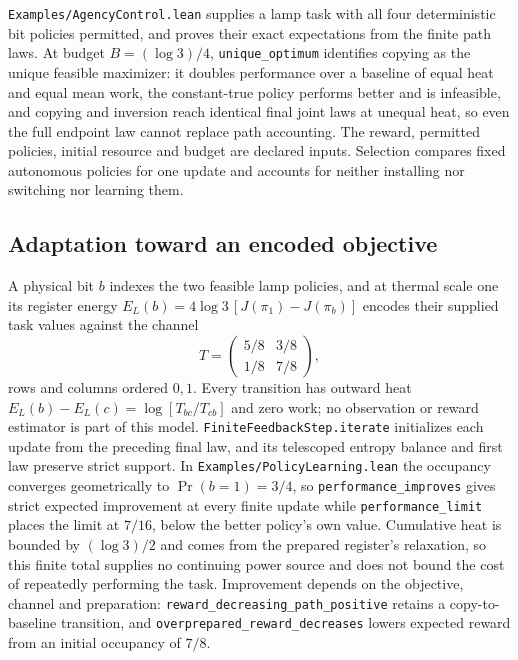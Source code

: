 \documentclass{article}
\begin{document}
\nolinkurl{Examples/AgencyControl.lean} supplies a lamp task with all four
deterministic bit policies permitted, and proves their exact expectations from
the finite path laws. At budget $B=(\log3)/4$, \texttt{unique\_optimum}
identifies copying as the unique feasible maximizer: it doubles performance
over a baseline of equal heat and equal mean work, the constant-true policy
performs better and is infeasible, and copying and inversion reach identical
final joint laws at unequal heat, so even the full endpoint law cannot replace
path accounting. The reward, permitted policies, initial resource and budget
are declared inputs. Selection compares fixed autonomous policies for one
update and accounts for neither installing nor switching nor learning them.

\subsection{Adaptation toward an encoded objective}
\label{sec:supp-policy-learning}

A physical bit $b$ indexes the two feasible lamp policies, and at thermal scale
one its register energy $E_L(b)=4\log3\,[J(\pi_1)-J(\pi_b)]$ encodes their
supplied task values against the channel
\begin{equation}
 T=\begin{pmatrix}5/8&3/8\\1/8&7/8\end{pmatrix},
 \label{eq:policy-learning-channel}
\end{equation}
rows and columns ordered $0,1$. Every transition has outward heat
$E_L(b)-E_L(c)=\log[T_{bc}/T_{cb}]$ and zero work; no observation or reward
estimator is part of this model. \texttt{FiniteFeedbackStep.iterate}
initializes each update from the preceding final law, and its telescoped
entropy balance and first law preserve strict support. In
\nolinkurl{Examples/PolicyLearning.lean} the occupancy converges geometrically to
$\Pr(b=1)=3/4$, so \nolinkurl{performance_improves} gives strict
expected improvement at every finite update while
\nolinkurl{performance_limit} places the limit at $7/16$, below the
better policy's own value. Cumulative heat is bounded by $(\log3)/2$ and comes
from the prepared register's relaxation, so this finite total supplies no
continuing power source and does not bound the cost of repeatedly performing
the task. Improvement depends on the objective, channel and preparation:
\nolinkurl{reward_decreasing_path_positive}
retains a copy-to-baseline transition, and
\nolinkurl{overprepared_reward_decreases} lowers expected
reward from an initial occupancy of $7/8$.
\end{document}
